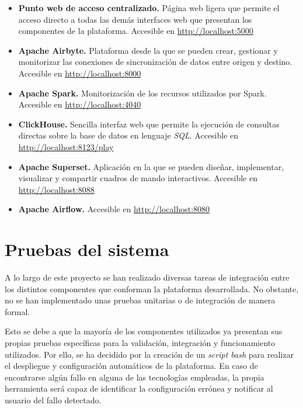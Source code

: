\begin{itemize}
    \item \textbf{Punto web de acceso centralizado.} Página web ligera que permite el acceso directo a todas las demás interfaces web que presentan los componentes de la plataforma. Accesible en \url{http://localhost:5000}

    \item \textbf{Apache Airbyte.} Plataforma desde la que se pueden crear, gestionar y monitorizar las conexiones de sincronización de datos entre origen y destino. Accesible en \url{http://localhost:8000}

    \item \textbf{Apache Spark.} Monitorización de los recursos utilizados por Spark. Accesible en \url{http://localhost:4040}

    \item \textbf{ClickHouse.} Sencilla interfaz web que permite la ejecución de consultas directas sobre la base de datos en lenguaje \textit{SQL}. Accesible en \url{http://localhost:8123/play}

    \item \textbf{Apache Superset.} Aplicación en la que se pueden diseñar, implementar, visualizar y compartir cuadros de mando interactivos. Accesible en \url{http://localhost:8088}

    \item \textbf{Apache Airflow.} Accesible en \url{http://localhost:8080}
\end{itemize}

\section{Pruebas del sistema}

A lo largo de este proyecto se han realizado diversas tareas de integración entre los distintos componentes que conforman la plataforma desarrollada. No obstante, no se han implementado unas pruebas unitarias o de integración de manera formal.

Esto se debe a que la mayoría de los componentes utilizados ya presentan sus propias pruebas específicas para la validación, integración y funcionamiento utilizados. Por ello, se ha decidido por la creación de un \textit{script bash} para realizar el despliegue y configuración automáticos de la plataforma. En caso de encontrarse algún fallo en alguna de las tecnologías empleadas, la propia herramienta será capaz de identificar la configuración errónea y notificar al usuario del fallo detectado.
